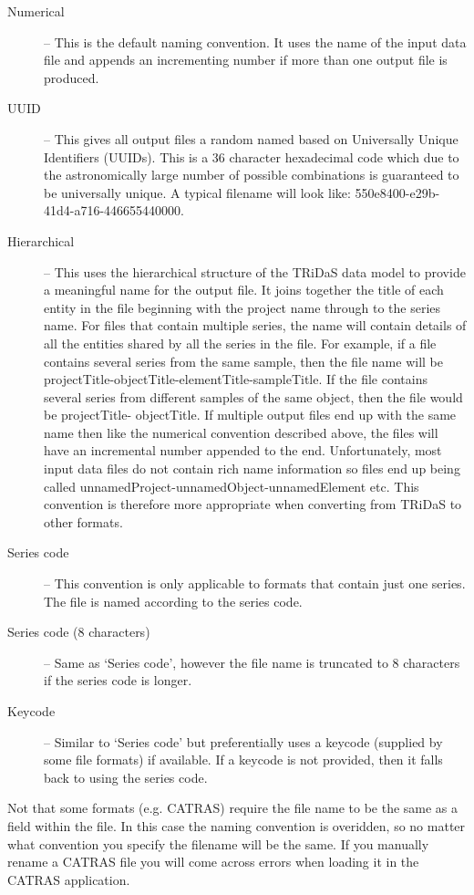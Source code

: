 \documentclass[10pt, headsepline,DIV14,BCOR0.5cm]{scrreprt}
\begin{document}
\begin{description}
 \item[Numerical] -- This is the default naming convention. It uses the name of the input data file and
appends an incrementing number if more than one output file is produced.
 \item[UUID] -- This gives all output files a random named based on Universally Unique Identifiers
(UUIDs). This is a 36 character hexadecimal code which due to the astronomically
large number of possible combinations is guaranteed to be universally unique. A
typical filename will look like: 550e8400-e29b-41d4-a716-446655440000.
 \item[Hierarchical] -- This uses the hierarchical structure of the TRiDaS data model to provide a meaningful
name for the output file. It joins together the title of each entity in the file beginning
with the project name through to the series name. For files that contain multiple series,
the name will contain details of all the entities shared by all the series in the file. For
example, if a file contains several series from the same sample, then the file name
will be projectTitle-objectTitle-elementTitle-sampleTitle. If the file contains several
series from different samples of the same object, then the file would be projectTitle-
objectTitle. If multiple output files end up with the same name then like the numerical
convention described above, the files will have an incremental number appended to
the end. Unfortunately, most input data files do not contain rich name information
so files end up being called unnamedProject-unnamedObject-unnamedElement etc.
This convention is therefore more appropriate when converting from TRiDaS to other
formats.
\item[Series code] -- This convention is only applicable to formats that contain just one series.  The file is named according to the series code.
\item[Series code (8 characters)] -- Same as `Series code', however the file name is truncated to 8 characters if the series code is longer.  
\item[Keycode] -- Similar to `Series code' but preferentially uses a keycode (supplied by some file formats) if available.  If a keycode is not provided, then it falls back to using the series code.
 \end{description}

Not that some formats (e.g. CATRAS) require the file name to be the same as a field within the file.  In this case the naming convention is overidden, so no matter what convention you specify the filename will be the same.  If you manually rename a CATRAS file you will come across errors when loading it in the CATRAS application.
\end{document}
